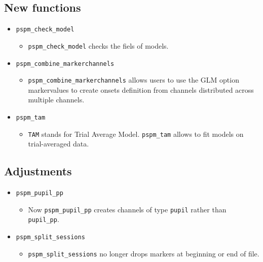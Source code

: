 \documentclass[english]{article}
\numberwithin{equation}{section}
\numberwithin{figure}{section}
\begin{document}
\subsection*{New functions}
\begin{itemize}
\item \texttt{pspm\_check\_model}
\begin{itemize}
\item \texttt{pspm\_check\_model} checks the fiels of models.
\end{itemize}
\item \texttt{pspm\_combine\_markerchannels}
\begin{itemize}
\item \texttt{pspm\_combine\_markerchannels} allows users to use the GLM
option \textquotedbl markervalues\textquotedbl{} to create onsets
definition from channels distributed across multiple channels.
\end{itemize}
\item \texttt{pspm\_tam}
\begin{itemize}
\item \texttt{TAM} stands for Trial Average Model. \texttt{pspm\_tam} allows
to fit models on trial-averaged data. 
\end{itemize}
\end{itemize}

\subsection*{Adjustments}
\begin{itemize}
\item \texttt{pspm\_pupil\_pp}
\begin{itemize}
\item Now \texttt{pspm\_pupil\_pp} creates channels of type \texttt{pupil}
rather than \texttt{pupil\_pp}.
\end{itemize}
\item \texttt{pspm\_split\_sessions}
\begin{itemize}
\item \texttt{pspm\_split\_sessions} no longer drops markers at beginning
or end of file. 
\end{itemize}
\end{itemize}
\end{document}
